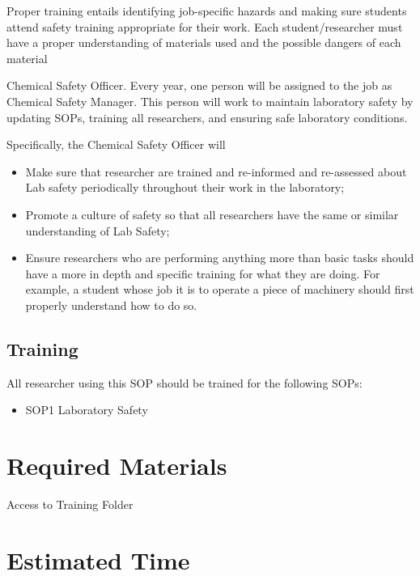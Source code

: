 \documentclass[12pt]{../SOP3_beta}\usepackage[]{graphicx}\usepackage[]{color}
\begin{document}
\NP Proper training entails identifying job-specific hazards and making sure students attend safety training appropriate for their work. Each student/researcher must have a proper understanding of materials used and the possible dangers of each material

\NP Chemical Safety Officer. Every year, one person will be assigned to the job as Chemical Safety Manager. This person will work to maintain laboratory safety by updating SOPs, training all researchers, and ensuring safe laboratory conditions.

\NP Specifically, the Chemical Safety Officer will 

\begin{itemize}
  \item Make sure that researcher are trained and re-informed and re-assessed about Lab safety periodically throughout their work in the laboratory;
  \item Promote a culture of safety so that all researchers have the same or similar understanding of Lab Safety;
  \item Ensure researchers who are performing anything more than basic tasks should have a more in depth and specific training for what they are doing. For example, a student whose job it is to operate a piece of machinery should first properly understand how to do so.

\end{itemize}

\subsection*{Training}

\NP All researcher using this SOP should be trained for the following SOPs:

\begin{itemize}
  \item SOP1 Laboratory Safety
\end{itemize}

\section{Required Materials}

\NP Access to Training Folder

\section{Estimated Time}
\end{document}
